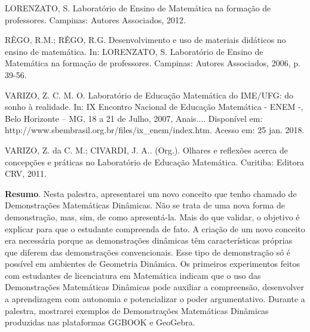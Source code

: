 \begin{thebibliography}{999}
	\bibitem{} LORENZATO, S. Laboratório de Ensino de Matemática na formação de professores. Campinas: Autores Associados, 2012.
	
	\bibitem{} RÊGO, R.M.; RÊGO, R.G. Desenvolvimento e uso de materiais didáticos no ensino de matemática. In: LORENZATO, S. Laboratório de Ensino de Matemática na formação de professores. Campinas: Autores Associados, 2006, p. 39-56.
	
	\bibitem{} VARIZO, Z. C. M. O. Laboratório de Educação Matemática do IME/UFG: do sonho à realidade. In: IX Encontro Nacional de Educação Matemática - ENEM -, Belo Horizonte – MG, 18 a 21 de Julho, 2007, Anais.... Disponível em: http://www.sbembrasil.org.br/files/ix\_enem/index.htm. Acesso em: 25 jan. 2018.
	
	\bibitem{} VARIZO, Z. da C. M.; CIVARDI, J. A.. (Org.). Olhares e reflexões acerca de concepções e práticas no Laboratório de Educação Matemática. Curitiba: Editora CRV, 2011.
	\end{thebibliography}	
	
	\vspace{24pt}



	\noindent\textbf{Resumo}.\label{jccn} 
	Nesta palestra, apresentarei um novo conceito que tenho chamado de Demonstrações Matemáticas Dinâmicas. Não se trata de uma nova forma de demonstração, mas, sim, de como apresentá-la. Mais do que validar, o objetivo é explicar para que o estudante compreenda de fato. A criação de um novo conceito era necessária porque as demonstrações dinâmicas têm características próprias que diferem das demonstrações convencionais. Esse tipo de demonstração só é possível em ambientes de Geometria Dinâmica. Os primeiros experimentos feitos com estudantes de licenciatura em Matemática indicam que o uso das Demonstrações Matemáticas Dinâmicas pode auxiliar a compreensão, desenvolver a aprendizagem com autonomia e potencializar o poder argumentativo. Durante a palestra, mostrarei exemplos de Demonstrações Matemáticas Dinâmicas produzidas nas plataformas GGBOOK e GeoGebra.


